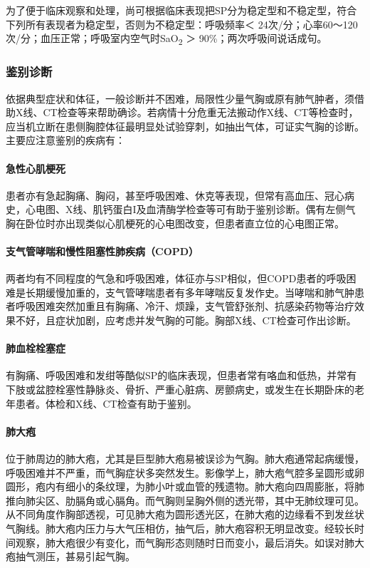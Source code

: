 为了便于临床观察和处理，尚可根据临床表现把SP分为稳定型和不稳定型，符合下列所有表现者为稳定型，否则为不稳定型：呼吸频率＜
24次/分；心率60～120次/分；血压正常；呼吸室内空气时SaO\textsubscript{2}
＞ 90\%；两次呼吸间说话成句。

\subsubsection{鉴别诊断}

依据典型症状和体征，一般诊断并不困难，局限性少量气胸或原有肺气肿者，须借助X线、CT检查等来帮助确诊。若病情十分危重无法搬动作X线、CT等检查时，应当机立断在患侧胸腔体征最明显处试验穿刺，如抽出气体，可证实气胸的诊断。主要应注意鉴别的疾病有：

\paragraph{急性心肌梗死}

患者亦有急起胸痛、胸闷，甚至呼吸困难、休克等表现，但常有高血压、冠心病史，心电图、X线、肌钙蛋白I及血清酶学检查等可有助于鉴别诊断。偶有左侧气胸在卧位时亦出现类似心肌梗死的心电图改变，但患者直立位的心电图正常。

\paragraph{支气管哮喘和慢性阻塞性肺疾病（COPD）}

两者均有不同程度的气急和呼吸困难，体征亦与SP相似，但COPD患者的呼吸困难是长期缓慢加重的，支气管哮喘患者有多年哮喘反复发作史。当哮喘和肺气肿患者呼吸困难突然加重且有胸痛、冷汗、烦躁，支气管舒张剂、抗感染药物等治疗效果不好，且症状加剧，应考虑并发气胸的可能。胸部X线、CT检查可作出诊断。

\paragraph{肺血栓栓塞症}

有胸痛、呼吸困难和发绀等酷似SP的临床表现，但患者常有咯血和低热，并常有下肢或盆腔栓塞性静脉炎、骨折、严重心脏病、房颤病史，或发生在长期卧床的老年患者。体检和X线、CT检查有助于鉴别。

\paragraph{肺大疱}

位于肺周边的肺大疱，尤其是巨型肺大疱易被误诊为气胸。肺大疱通常起病缓慢，呼吸困难并不严重，而气胸症状多突然发生。影像学上，肺大疱气腔多呈圆形或卵圆形，疱内有细小的条纹理，为肺小叶或血管的残遗物。肺大疱向四周膨胀，将肺推向肺尖区、肋膈角或心膈角。而气胸则呈胸外侧的透光带，其中无肺纹理可见。从不同角度作胸部透视，可见肺大疱为圆形透光区，在肺大疱的边缘看不到发丝状气胸线。肺大疱内压力与大气压相仿，抽气后，肺大疱容积无明显改变。经较长时间观察，肺大疱很少有变化，而气胸形态则随时日而变小，最后消失。如误对肺大疱抽气测压，甚易引起气胸。

